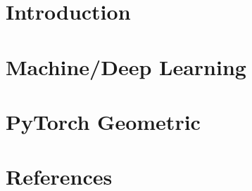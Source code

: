 \section[Intro]{Introduction}


\section[MLDL]{Machine/Deep Learning}


\section[PyG]{PyTorch Geometric}



\section[Refs]{References}
